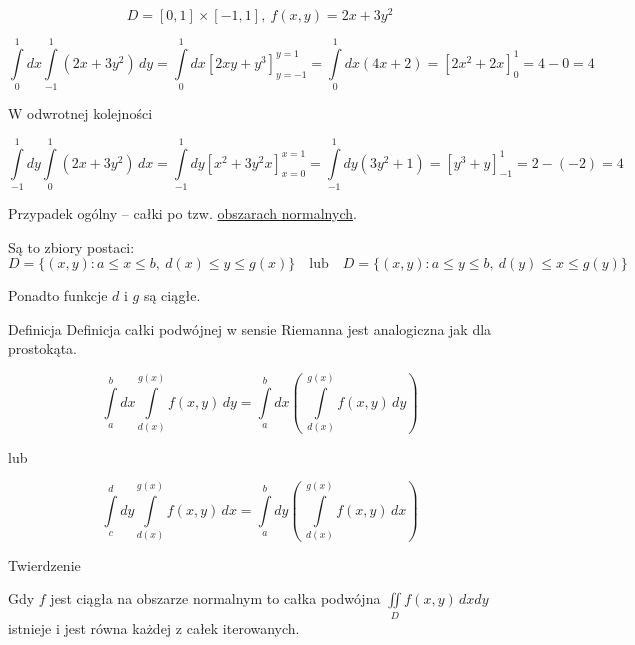 \begin{przyklad}

\[ D = [0,1] \times [-1,1], \ f(x,y) = 2x + 3y^2 \]

\[ \int\limits_{0}^{1} dx \int\limits_{-1}^{1} (2x+3y^2) \, dy = \int\limits_{0}^{1} dx \left[ 2xy + y^3 \right]_{y = -1}^{y=1} 
= \int\limits_{0}^{1} dx (4x+2) = \left[ 2x^2 + 2x \right]_0^1 = 4 - 0 = 4 \]

\begin{center} W odwrotnej kolejności \end{center}
\[ \int\limits_{-1}^{1} dy \int\limits_{0}^{1} (2x+3y^2)\, dx = \int\limits_{-1}^{1} dy \left[ x^2 + 3y^2x \right]_{x=0}^{x=1} 
= \int\limits_{-1}^{1} dy (3y^2 + 1) = \left[ y^3 + y \right]_{-1}^{1} = 2- (-2) = 4 \]

Przypadek ogólny -- całki po tzw. \underline{obszarach normalnych}.

Są to zbiory postaci:
\[ D = \{ (x,y): a \leq x \leq b, \ d(x) \leq y \leq g(x) \} \quad \textrm{lub} \quad D = \{ (x,y): a \leq y \leq b, \ d(y) \leq x \leq g(y) \} \]

Ponadto funkcje $d$ i $g$ są ciągłe.
\end{przyklad}

\begin{tw}{Definicja}
Definicja całki podwójnej w sensie Riemanna jest analogiczna jak dla prostokąta.

\[ \int\limits_{a}^{b} dx \int\limits_{d(x)}^{g(x)} f(x,y)\, dy = \int\limits_{a}^{b} dx \left( \ \int\limits_{d(x)}^{g(x)} f(x,y)\, dy \right) \]
\begin{center} lub \end{center}
\[ \int\limits_{c}^{d} dy \int\limits_{d(x)}^{g(x)} f(x,y)\, dx = \int\limits_{a}^{b} dy \left( \ \int\limits_{d(x)}^{g(x)} f(x,y)\, dx \right) \]
\end{tw}

\begin{tw}{Twierdzenie}

Gdy $f$ jest ciągła na obszarze normalnym to całka podwójna $ \iint\limits_{D} f(x,y)\, dxdy $ istnieje i jest równa każdej z całek iterowanych. 

\end{tw}

